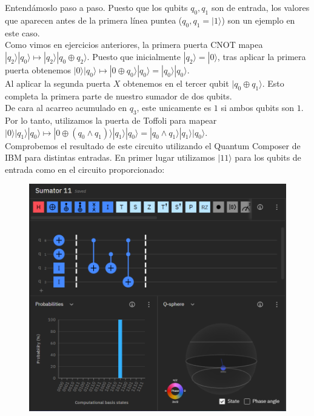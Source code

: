 \documentclass[11pt]{article}
\newcommand{\ra}{\rangle}
\theoremstyle{plain}
\begin{document}
Entendámoslo paso a paso. Puesto que los qubits $q_0, q_1$ son de entrada, los valores que aparecen antes de la primera línea puntea ($q_0, q_1 = |1\ra$) son un ejemplo en este caso. \\

Como vimos en ejercicios anteriores, la primera puerta CNOT mapea $|q_2\ra|q_0\ra \mapsto |q_2\ra|q_0 \oplus q_2\ra$. Puesto que inicialmente $|q_2\ra = |0\ra$, tras aplicar la primera puerta obtenemos $|0\ra|q_0\ra \mapsto |0 \oplus q_0\ra|q_0\ra = |q_0\ra|q_0\ra$. \\

Al aplicar la segunda puerta $X$ obtenemos en el tercer qubit $|q_0 \oplus q_1\ra$. Esto completa la primera parte de nuestro sumador de dos qubits. \\

De cara al acarreo acumulado en $q_3$, este unicamente es $1$ si ambos qubits son $1$. Por lo tanto, utilizamos la puerta de Toffoli para mapear $|0\ra|q_1\ra|q_0\ra \mapsto |0 \oplus (q_0 \wedge q_1)\ra|q_1\ra|q_0\ra = |q_0 \wedge q_1\ra|q_1\ra|q_0\ra $. \\

Comprobemos el resultado de este circuito utilizando el Quantum Composer de IBM para distintas entradas. En primer lugar utilizamos $|11\ra$ para los qubits de entrada como en el circuito proporcionado:

\begin{figure}[H]
	\centering
	\includegraphics[scale=0.7]{figures/sumator_11.png}
\end{figure}
\end{document}
